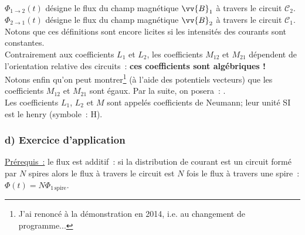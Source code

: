 \documentclass{article}
\renewcommand\overrightarrow{\vv}
\begin{document}
$\Phi_{\mathrm{1\rightarrow 2}}(t)$ désigne le flux du champ magnétique
$\overrightarrow{B}_{1}$ à travers le circuit $\mathcal{C}_{2}$. \\
$\Phi_{\mathrm{2\rightarrow 1}}(t)$ désigne le flux du champ magnétique
$\overrightarrow{B}_{2}$ à travers le circuit $\mathcal{C}_{1}$. \\
Notons que ces définitions sont encore licites si les intensités des
courants sont constantes. \\
Contrairement aux coefficients $L_{1}$ et $L_{2}$, les coefficients
$M_{\mathrm{12}}$ et $M_{\mathrm{21}}$ dépendent de l'orientation relative des
circuits : \textbf{ces coefficients sont algébriques !} \\
Notons enfin qu'on peut montrer\footnote{J'ai renoncé à la
démonstration en 2014, i.e. au changement de programme...} (à l'aide
des potentiels vecteurs) que les coefficients $M_{\mathrm{12}}$ et $M_{\mathrm{21}}$
sont égaux. Par la suite,
on posera : . \\
Les coefficients $L_{1}$, $L_{2}$ et $M$ sont appelés coefficients
de Neumann; leur unité SI est le henry (symbole : H).

\subsubsection*{d) Exercice d'application}
\underline{Prérequis :} le flux est additif : si la
distribution de courant est un circuit formé par $N$ spires alors le
flux à travers le circuit est $N$ fois le flux à travers une spire :
$\Phi(t) = N\Phi_{\mathrm{1\,spire}}$.
\end{document}

